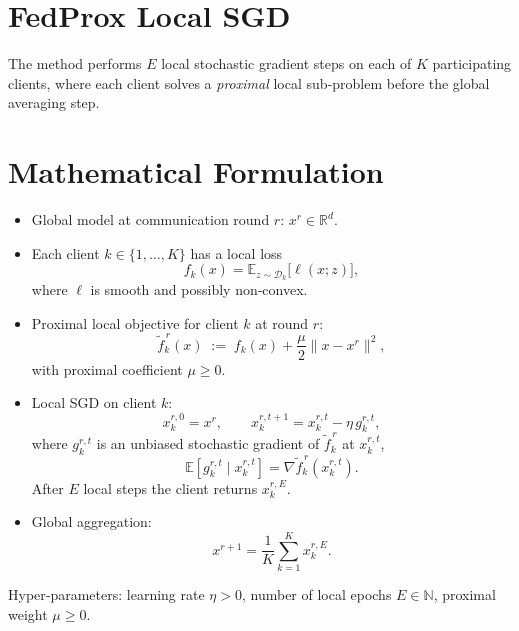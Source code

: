 \documentclass{article}
\newcommand{\E}{\mathbb{E}}
\newcommand{\R}{\mathbb{R}}
\begin{document}
\section*{FedProx Local SGD}
The method performs $E$ local stochastic gradient steps on each of $K$ participating clients, where each client solves a \emph{proximal} local sub‑problem before the global averaging step.

\section*{Mathematical Formulation}
\begin{itemize}[leftmargin=*]
    \item Global model at communication round $r$: $x^{r}\in\R^{d}$.
    \item Each client $k\in\{1,\dots,K\}$ has a local loss 
    \[
        f_k(x)=\E_{z\sim\mathcal{D}_k}\bigl[\ell(x;z)\bigr],
    \]
    where $\ell$ is smooth and possibly non‑convex.
    \item Proximal local objective for client $k$ at round $r$:
    \[
        \tilde f_{k}^{\,r}(x)\;:=\;f_k(x)+\frac{\mu}{2}\|x-x^{r}\|^{2},
    \]
    with proximal coefficient $\mu\ge 0$.
    \item Local SGD on client $k$:
    \[
        x_{k}^{r,0}=x^{r},\qquad 
        x_{k}^{r,t+1}=x_{k}^{r,t}-\eta\, g_{k}^{r,t},
    \]
    where $g_{k}^{r,t}$ is an unbiased stochastic gradient of $\tilde f_{k}^{\,r}$ at $x_{k}^{r,t}$,
    \[
        \E\!\left[g_{k}^{r,t}\mid x_{k}^{r,t}\right]=\nabla \tilde f_{k}^{\,r}(x_{k}^{r,t}) .
    \]
    After $E$ local steps the client returns $x_{k}^{r,E}$.
    \item Global aggregation:
    \[
        x^{r+1}= \frac{1}{K}\sum_{k=1}^{K}x_{k}^{r,E}.
    \]
\end{itemize}
Hyper‑parameters: learning rate $\eta>0$, number of local epochs $E\in\mathbb{N}$, proximal weight $\mu\ge0$.
\end{document}
